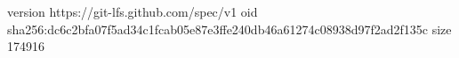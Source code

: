 version https://git-lfs.github.com/spec/v1
oid sha256:dc6c2bfa07f5ad34c1fcab05e87e3ffe240db46a61274c08938d97f2ad2f135c
size 174916

